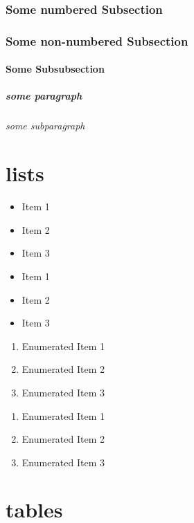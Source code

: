 \documentclass[a4paper, 12pt]{report}
\begin{document}
\subsection{Some numbered Subsection}
\subsection*{Some non-numbered Subsection}
\subsubsection*{Some Subsubsection}
\paragraph{some paragraph}
\subparagraph{some subparagraph}

\chapter{lists}

\begin{itemize}
	\item{Item 1}
	\item{Item 2}
	\item{Item 3}
\end{itemize}
\renewcommand{\labelitemi}{$\spadesuit$}
\begin{itemize}
	\item{Item 1}
	\item{Item 2}
	\item{Item 3}
\end{itemize}
\begin{enumerate}
 \item Enumerated Item 1
 \item Enumerated Item 2
 \item Enumerated Item 3
\end{enumerate}
\begin{enumerate}[label=\roman*]
 \item Enumerated Item 1
 \item Enumerated Item 2
 \item Enumerated Item 3
\end{enumerate}

\chapter{tables}
\end{document}
